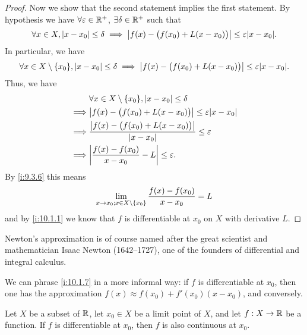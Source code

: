 \begin{proof}
  Now we show that the second statement implies the first statement.
  By hypothesis we have \(\forall \varepsilon \in \mathbb{R}^+\), \(\exists \delta \in \mathbb{R}^+\) such that
  \[
    \forall x \in X, \abs{x - x_0} \leq \delta \implies \abs{f(x) - \big(f(x_0) + L(x - x_0)\big)} \leq \varepsilon \abs{x - x_0}.
  \]
  In particular, we have
  \[
    \forall x \in X \setminus \set{x_0}, \abs{x - x_0} \leq \delta \implies \abs{f(x) - \big(f(x_0) + L(x - x_0)\big)} \leq \varepsilon \abs{x - x_0}.
  \]
  Thus, we have
  \begin{align*}
             & \forall x \in X \setminus \set{x_0}, \abs{x - x_0} \leq \delta                     \\
    \implies & \abs{f(x) - \big(f(x_0) + L(x - x_0)\big)} \leq \varepsilon \abs{x - x_0}          \\
    \implies & \dfrac{\abs{f(x) - \big(f(x_0) + L(x - x_0)\big)}}{\abs{x - x_0}} \leq \varepsilon \\
    \implies & \abs{\dfrac{f(x) - f(x_0)}{x - x_0} - L} \leq \varepsilon.
  \end{align*}
  By \cref{i:9.3.6} this means
  \[
    \lim_{x \to x_0 ; x \in X \setminus \left\lbrace x_0\right\rbrace} \dfrac{f(x) - f(x_0)}{x - x_0} = L
  \]
  and by \cref{i:10.1.1} we know that \(f\) is differentiable at \(x_0\) on \(X\) with derivative \(L\).
\end{proof}

\begin{rmk}\label{i:10.1.8}
  Newton's approximation is of course named after the great scientist and mathematician Isaac Newton (1642--1727), one of the founders of differential and integral calculus.
\end{rmk}

\begin{rmk}\label{i:10.1.9}
  We can phrase \cref{i:10.1.7} in a more informal way:
  if \(f\) is differentiable at \(x_0\), then one has the approximation \(f(x) \approx f(x_0) + f'(x_0)(x - x_0)\), and conversely.
\end{rmk}

\begin{prop}\label{i:10.1.10}
  Let \(X\) be a subset of \(\mathbb{R}\), let \(x_0 \in X\) be a limit point of \(X\), and let \(f : X \to \mathbb{R}\) be a function.
  If \(f\) is differentiable at \(x_0\), then \(f\) is also continuous at \(x_0\).
\end{prop}

